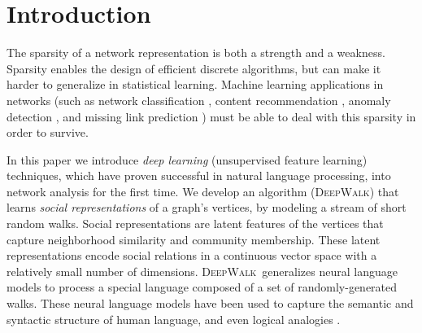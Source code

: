 \documentclass{sig-alternate}
\newcommand{\ouralgorithm}{\textsc{DeepWalk}}
\begin{document}



\section{Introduction}

The sparsity of a network representation is both a strength and a weakness.
Sparsity enables the design of efficient discrete algorithms, but can make it harder to generalize in statistical learning.
Machine learning applications in networks (such as network classification \cite{getoor2007introduction,sen2008collective}, content recommendation \cite{fouss2007random}, anomaly detection \cite{chandola2009anomaly}, and missing link prediction \cite{liben2007link}) must be able to deal with this sparsity in order to survive.

In this paper we introduce \emph{deep learning} (unsupervised feature learning) \cite{deepfuture} techniques, which have proven successful in natural language processing, into network analysis for the first time.
We develop an algorithm (\ouralgorithm) that learns \emph{social representations} of a graph's vertices, by modeling a stream of short random walks.
Social representations are latent features of the vertices that capture neighborhood similarity and community membership.
These latent representations encode social relations in a continuous vector space with a relatively small number of dimensions.
\ouralgorithm\ generalizes neural language models to process a special language composed of a set of randomly-generated walks.
These neural language models have been used to capture the semantic and syntactic structure of human language\cite{senna1}, and even logical analogies \cite{regularities}.
\end{document}
